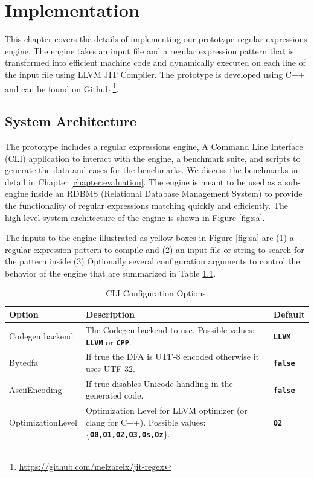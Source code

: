\chapter{Implementation}\label{chapter:implementation}
This chapter covers the details of implementing our prototype regular expressions engine. The engine takes an input file and a regular expression pattern that is transformed into efficient machine code and dynamically executed on each line of the input file using LLVM JIT Compiler. The prototype is developed using C++ and can be found on Github \footnote{\url{https://github.com/melzareix/jit-regex}}.

\section{System Architecture}
The prototype includes a regular expressions engine, A Command Line Interface (CLI) application to interact with the engine, a benchmark suite, and scripts to generate the data and cases for the benchmarks. We discuss the benchmarks in detail in Chapter \ref{chapter:evaluation}.  The engine is meant to be used as a sub-engine inside an RDBMS (Relational Database Management System) to provide the functionality of regular expressions matching quickly and efficiently. The high-level system architecture of the engine is shown in Figure \ref{fig:sa}.

The inputs to the engine illustrated as yellow boxes in Figure \ref{fig:sa} are (1) a regular expression pattern to compile and (2) an input file or string to search for the pattern inside (3) Optionally several configuration arguments to control the behavior of the engine that are summarized in Table \ref{tab:cliconf}. 

{\renewcommand{\arraystretch}{1.5}%
\begin{table}[htpb]
\centering
\begin{adjustbox}{width=\textwidth,center=\textwidth}
\small
\begin{tabularx}{\textwidth}{|l|X|l|}
\hline
Option        & Description & Default  \\
\hline
Codegen backend & The Codegen backend to use. Possible values: \texttt{\textbf{LLVM}} or \texttt{\textbf{CPP}}. & \texttt{\textbf{LLVM}}\\
\hline
Bytedfa & If true the DFA is UTF-8 encoded otherwise it uses UTF-32. & \texttt{\textbf{false}} \\
\hline
AsciiEncoding & If true disables Unicode handling in the generated code. & \texttt{\textbf{false}} \\
\hline
OptimizationLevel & Optimization Level for LLVM optimizer (or clang for C++). Possible values: \{\texttt{\textbf{O0,O1,O2,O3,Os,Oz}}\}. & \texttt{\textbf{O2}}\\
\hline
\end{tabularx}
\end{adjustbox}
\caption[CLI Configuration Options]{CLI Configuration Options.}\label{tab:cliconf}
\end{table}}

